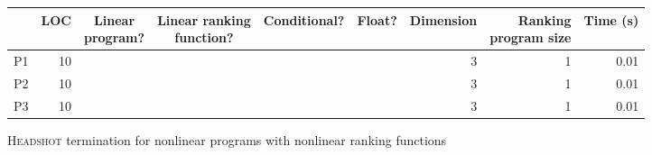 \documentclass[preprint]{sigplanconf}
\theoremstyle{definition}
\newcommand{\xmark}{\ding{55}}
\begin{document}
\begin{figure*}
\centering
\begin{tabular}{|l|r|c|c|c|c|r|r|r|}
\hline
    & LOC & \shortstack{Linear \\ program?} & \shortstack{Linear ranking \\ function?}  & Conditional? & Float? & Dimension & \shortstack{Ranking \\ program size} & Time (s)\\
    \hline
    \hline
 P1 & 10 & \xmark & \xmark & \xmark & \xmark & 3 & 1 & 0.01 \\
 P2 & 10 & \xmark & \xmark & \xmark & \xmark & 3 & 1 & 0.01 \\
 P3 & 10 & \xmark & \xmark & \xmark & \xmark & 3 & 1 & 0.01 \\
 \hline
\end{tabular}

\caption{\textsc{Headshot} termination for nonlinear programs with nonlinear ranking functions\label{fig:nonlinear}}
 \end{figure*}



{}
\end{document}

